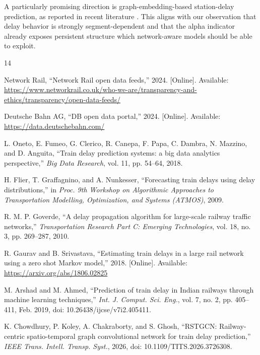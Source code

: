 \documentclass[conference]{IEEEtran}
\begin{document}
A particularly promising direction is graph-embedding-based station-delay prediction, as reported in recent literature \cite{chowdhury2025rstgcn}. This aligns with our observation that delay behavior is strongly segment-dependent and that the alpha indicator already exposes persistent structure which network-aware models should be able to exploit.

\balance
\begin{thebibliography}{14}

Network Rail, ``Network Rail open data feeds,'' 2024. [Online]. Available: \url{https://www.networkrail.co.uk/who-we-are/transparency-and-ethics/transparency/open-data-feeds/}

Deutsche Bahn AG, ``DB open data portal,'' 2024. [Online]. Available: \url{https://data.deutschebahn.com/}

L. Oneto, E. Fumeo, G. Clerico, R. Canepa, F. Papa, C. Dambra, N. Mazzino, and D. Anguita, ``Train delay prediction systems: a big data analytics perspective,'' \emph{Big Data Research}, vol. 11, pp. 54--64, 2018.

H. Flier, T. Graffagnino, and A. Nunkesser, ``Forecasting train delays using delay distributions,'' in \emph{Proc. 9th Workshop on Algorithmic Approaches to Transportation Modelling, Optimization, and Systems (ATMOS)}, 2009.

R. M. P. Goverde, ``A delay propagation algorithm for large-scale railway traffic networks,'' \emph{Transportation Research Part C: Emerging Technologies}, vol. 18, no. 3, pp. 269--287, 2010.

R. Gaurav and B. Srivastava, ``Estimating train delays in a large rail network using a zero shot Markov model,'' 2018. [Online]. Available: \url{https://arxiv.org/abs/1806.02825}

M. Arshad and M. Ahmed, ``Prediction of train delay in Indian railways through machine learning techniques,'' \emph{Int. J. Comput. Sci. Eng.}, vol. 7, no. 2, pp. 405--411, Feb. 2019, doi: 10.26438/ijcse/v7i2.405411.

K. Chowdhury, P. Koley, A. Chakraborty, and S. Ghosh, ``RSTGCN: Railway-centric spatio-temporal graph convolutional network for train delay prediction,'' \emph{IEEE Trans. Intell. Transp. Syst.}, 2026, doi: 10.1109/TITS.2026.3726308.


\end{thebibliography}
\end{document}
